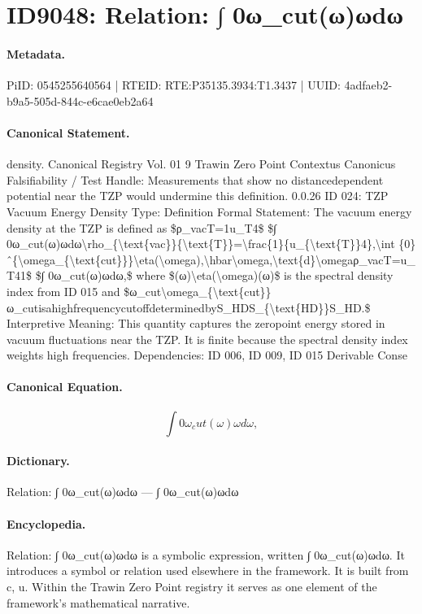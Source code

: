 \section*{ID9048: Relation: ∫ 0ω\_cut(ω)ωdω}
\paragraph{Metadata.}
PiID: 0545255640564 | RTEID: RTE:P35135.3934:T1.3437 | UUID: 4adfaeb2-b9a5-505d-844c-e6cae0eb2a64

\paragraph{Canonical Statement.}
density. Canonical Registry Vol. 01 9 Trawin Zero Point Contextus Canonicus Falsifiability / Test Handle: Measurements that show no distancedependent potential near the TZP would undermine this definition. 0.0.26 ID 024: TZP Vacuum Energy Density Type: Definition Formal Statement: The vacuum energy density at the TZP is defined as \$ρ\_vacT=1u\_T4\$ \$∫ 0ω\_cut(ω)ωdω\textbackslash{}rho\_\{\textbackslash{}text\{vac\}\}\{\textbackslash{}text\{T\}\}=\textbackslash{}frac\{1\}\{u\_\{\textbackslash{}text\{T\}\}4\},\textbackslash{}int \{0\}ˆ\{\textbackslash{}omega\_\{\textbackslash{}text\{cut\}\}\}\textbackslash{}eta(\textbackslash{}omega),\textbackslash{}hbar\textbackslash{}omega,\textbackslash{}text\{d\}\textbackslash{}omegaρ\_vacT=u\_T41\$ \$∫ 0ω\_cut(ω)ωdω,\$ where \$(ω)\textbackslash{}eta(\textbackslash{}omega)(ω)\$ is the spectral density index from ID 015 and \$ω\_cut\textbackslash{}omega\_\{\textbackslash{}text\{cut\}\}ω\_cutisahighfrequencycutoffdeterminedbyS\_HDS\_\{\textbackslash{}text\{HD\}\}S\_HD.\$ Interpretive Meaning: This quantity captures the zeropoint energy stored in vacuum fluctuations near the TZP. It is finite because the spectral density index weights high frequencies. Dependencies: ID 006, ID 009, ID 015 Derivable Conse

\paragraph{Canonical Equation.}
\[
∫ 0ω_cut(ω)ωdω,
\]

\paragraph{Dictionary.}
Relation: ∫ 0ω\_cut(ω)ωdω — ∫ 0ω\_cut(ω)ωdω

\paragraph{Encyclopedia.}
Relation: ∫ 0ω\_cut(ω)ωdω is a symbolic expression, written ∫ 0ω\_cut(ω)ωdω. It introduces a symbol or relation used elsewhere in the framework. It is built from c, u. Within the Trawin Zero Point registry it serves as one element of the framework's mathematical narrative.
